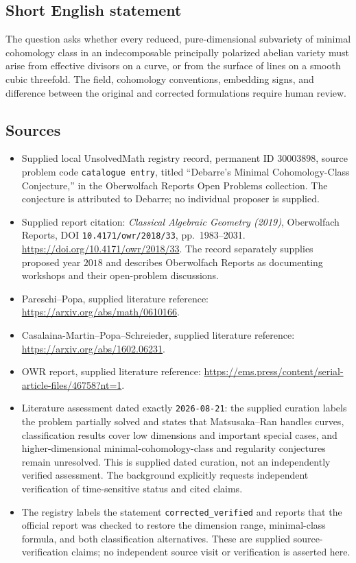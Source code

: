 \documentclass[11pt]{article}
\begin{document}
\subsection{Short English statement}
The question asks whether every reduced, pure-dimensional subvariety of minimal cohomology class in an indecomposable principally polarized abelian variety must arise from effective divisors on a curve, or from the surface of lines on a smooth cubic threefold. The field, cohomology conventions, embedding signs, and difference between the original and corrected formulations require human review.
\subsection{Sources}
\begin{itemize}
\item Supplied local UnsolvedMath registry record, permanent ID \(30003898\), source problem code \texttt{catalogue entry}, titled ``Debarre's Minimal Cohomology-Class Conjecture,'' in the Oberwolfach Reports Open Problems collection. The conjecture is attributed to Debarre; no individual proposer is supplied.
\item Supplied report citation: \emph{Classical Algebraic Geometry (2019)}, Oberwolfach Reports, DOI \texttt{10.4171/owr/2018/33}, pp.~1983--2031. \url{https://doi.org/10.4171/owr/2018/33}. The record separately supplies proposed year \(2018\) and describes Oberwolfach Reports as documenting workshops and their open-problem discussions.
\item Pareschi--Popa, supplied literature reference: \url{https://arxiv.org/abs/math/0610166}.
\item Casalaina-Martin--Popa--Schreieder, supplied literature reference: \url{https://arxiv.org/abs/1602.06231}.
\item OWR report, supplied literature reference: \url{https://ems.press/content/serial-article-files/46758?nt=1}.
\item Literature assessment dated exactly \texttt{2026-08-21}: the supplied curation labels the problem partially solved and states that Matsusaka--Ran handles curves, classification results cover low dimensions and important special cases, and higher-dimensional minimal-cohomology-class and regularity conjectures remain unresolved. This is supplied dated curation, not an independently verified assessment. The background explicitly requests independent verification of time-sensitive status and cited claims.
\item The registry labels the statement \texttt{corrected\_verified} and reports that the official report was checked to restore the dimension range, minimal-class formula, and both classification alternatives. These are supplied source-verification claims; no independent source visit or verification is asserted here.
\end{itemize}
\end{document}
